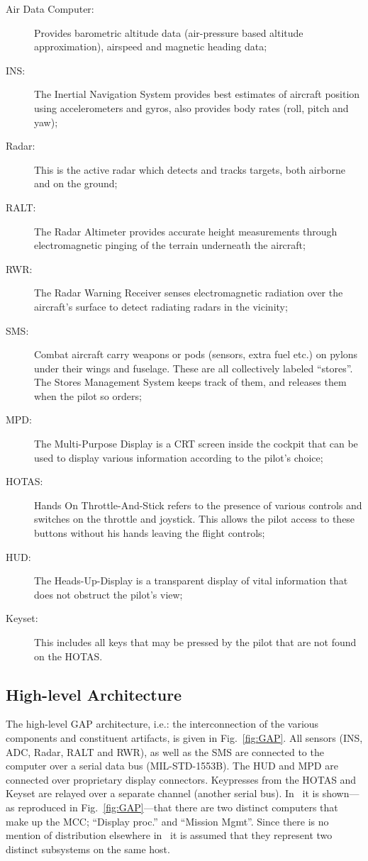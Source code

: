 \begin{description}
\item[Air Data Computer:]{Provides barometric altitude data
  (air-pressure based altitude approximation), airspeed and magnetic
  heading data;}
\item[INS:]{The Inertial Navigation System provides best estimates of
  aircraft position using accelerometers and gyros, also provides body
  rates (roll, pitch and yaw);}
\item[Radar:]{This is the active radar which detects and tracks
  targets, both airborne and on the ground;}
\item[RALT:]{The Radar Altimeter provides accurate height measurements
  through electromagnetic pinging of the terrain underneath the
  aircraft;}
\item[RWR:]{The Radar Warning Receiver senses electromagnetic
  radiation over the aircraft's surface to detect radiating radars in
  the vicinity;}
\item[SMS:]{Combat aircraft carry weapons or pods (sensors, extra fuel
  etc.) on pylons under their wings and fuselage. These are all
  collectively labeled ``stores''. The Stores Management System keeps
  track of them, and releases them when the pilot so orders;}
\item[MPD:]{The Multi-Purpose Display is a CRT screen inside the
  cockpit that can be used to display various information according to
  the pilot's choice;}
\item[HOTAS:]{Hands On Throttle-And-Stick refers to the presence of
  various controls and switches on the throttle and joystick. This
  allows the pilot access to these buttons without his hands leaving
  the flight controls;}
\item[HUD:]{The Heads-Up-Display is a transparent display of vital
  information that does not obstruct the pilot's view;}
\item[Keyset:]{This includes all keys that may be pressed by the
  pilot that are not found on the HOTAS.}
\end{description}

\subsection{High-level Architecture}
The high-level GAP architecture, i.e.: the interconnection of the
various components and constituent artifacts, is given in
Fig.~\ref{fig:GAP}. All sensors (INS, ADC, Radar, RALT and RWR), as
well as the SMS are connected to the computer over a serial data bus
(MIL-STD-1553B). The HUD and MPD are connected over proprietary
display connectors. Keypresses from the HOTAS and Keyset are relayed
over a separate channel (another serial bus). In~\cite{locke@rtss91}
it is shown---as reproduced in Fig.~\ref{fig:GAP}---that there are two
distinct computers that make up the MCC; ``Display proc.'' and
``Mission Mgmt''. Since there is no mention of distribution elsewhere
in~\cite{locke@rtss91} it is assumed that they represent two distinct
subsystems on the same host.


